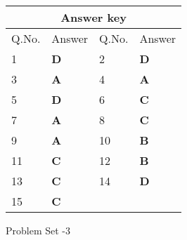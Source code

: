 \begin{table}[H]
	\centering
	\begin{tabular}{|p{1.5cm}|p{1.5cm}||p{1.5cm}|p{1.5cm}|}
		\hline
		\multicolumn{4}{|c|}{\textbf{Answer key}}\\\hline\hline
		\rowcolor{ocrel}Q.No.&Answer&Q.No.&Answer\\\hline
		1&\textbf{D} &2&\textbf{D}\\\hline 
		3&\textbf{A} &4&\textbf{A} \\\hline
		5&\textbf{D} &6&\textbf{C} \\\hline
		7&\textbf{A}&8&\textbf{C}\\\hline
		9&\textbf{A}&10&\textbf{B}\\\hline
		11&\textbf{C} &12&\textbf{B}\\\hline
		13&\textbf{C}&14&\textbf{D}\\\hline
		15&\textbf{C}& &\\\hline
		
	\end{tabular}
\end{table}
\begin{abox}
	Problem Set -3
\end{abox}
